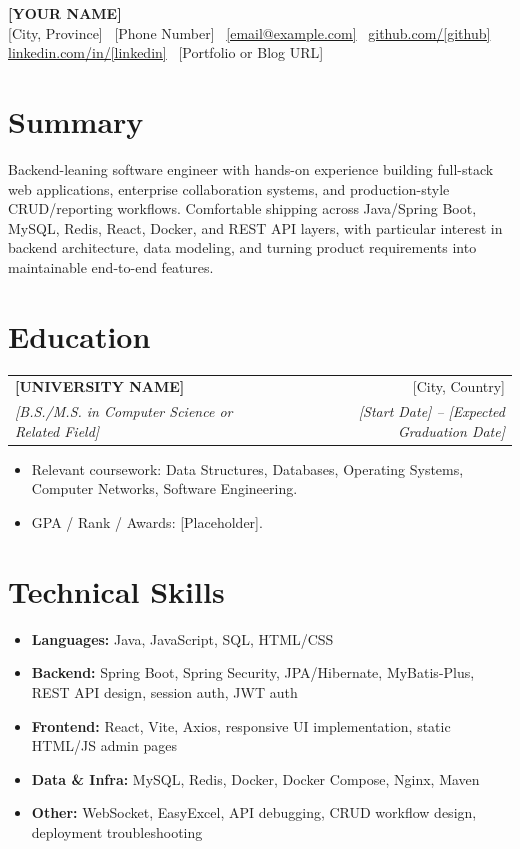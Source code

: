 \documentclass[11pt]{article}
\newcommand{\resumeSubheading}[4]{
  \begin{tabularx}{\textwidth}{Xr}
    \textbf{#1} & #2 \\
    \textit{#3} & \textit{#4} \\
  \end{tabularx}
}
\begin{document}
\begin{center}
    {\LARGE \textbf{[YOUR NAME]}} \\
    \vspace{4pt}
    [City, Province] \textbar\ [Phone Number] \textbar\ \href{mailto:[email@example.com]}{[email@example.com]} \textbar\ \href{https://github.com/[github]}{github.com/[github]} \\
    \vspace{2pt}
    \href{https://www.linkedin.com/in/[linkedin]}{linkedin.com/in/[linkedin]} \textbar\ [Portfolio or Blog URL]
\end{center}

\section*{Summary}
Backend-leaning software engineer with hands-on experience building full-stack web applications, enterprise collaboration systems, and production-style CRUD/reporting workflows. Comfortable shipping across Java/Spring Boot, MySQL, Redis, React, Docker, and REST API layers, with particular interest in backend architecture, data modeling, and turning product requirements into maintainable end-to-end features.

\section*{Education}
\resumeSubheading
  {[UNIVERSITY NAME]}{[City, Country]}
  {[B.S./M.S. in Computer Science or Related Field]}{[Start Date] -- [Expected Graduation Date]}
\begin{itemize}
  \item Relevant coursework: Data Structures, Databases, Operating Systems, Computer Networks, Software Engineering.
  \item GPA / Rank / Awards: [Placeholder].
\end{itemize}

\section*{Technical Skills}
\begin{itemize}
  \item \textbf{Languages:} Java, JavaScript, SQL, HTML/CSS
  \item \textbf{Backend:} Spring Boot, Spring Security, JPA/Hibernate, MyBatis-Plus, REST API design, session auth, JWT auth
  \item \textbf{Frontend:} React, Vite, Axios, responsive UI implementation, static HTML/JS admin pages
  \item \textbf{Data \& Infra:} MySQL, Redis, Docker, Docker Compose, Nginx, Maven
  \item \textbf{Other:} WebSocket, EasyExcel, API debugging, CRUD workflow design, deployment troubleshooting
\end{itemize}
\end{document}
